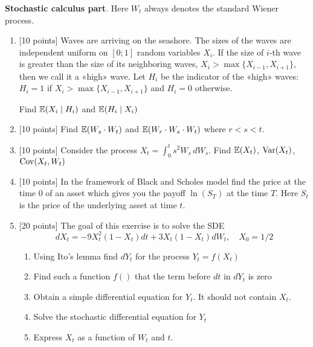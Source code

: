 \documentclass[12pt, a4paper]{article}
\begin{document}
\vspace{20pt}

\textbf{Stochastic calculus part}. Here $W_t$ always denotes the standard Wiener process.

\vspace{20pt}

\begin{enumerate}[resume]
\item $[$10 points] Waves are arriving on the seashore. The sizes of the waves are independent uniform on $[0;1]$ random variables $X_i$. If the size of $i$-th wave is greater than the size of its neighboring waves, $X_i>\max\{X_{i-1},X_{i+1}\}$, then we call it a «high» wave. Let $H_i$ be the indicator of the «high» waves: $H_i=1$ if $X_i>\max\{X_{i-1},X_{i+1}\}$ and $H_i=0$ otherwise.

Find $\mathbb{E}(X_i \mid H_i)$ and $\mathbb{E}(H_i \mid X_i)$
\item $[$10 points] Find $\mathbb{E}(W_s \cdot W_t)$ and $\mathbb{E}(W_r \cdot W_s \cdot W_t)$ where $r<s<t$.
\item $[$10 points] Consider the process $X_t=\int_0^t s^2 W_s\,dW_s$. Find $\mathbb{E}(X_t)$, $\operatorname{Var}(X_t)$, $\operatorname{Cov}(X_t,W_t)$
\item $[$10 points] In the framework of Black and Scholes model find the price at the time $0$ of an asset which gives you the payoff $\ln(S_T)$ at the time $T$. Here $S_t$ is the price of the underlying asset at time $t$.

\item $[$20 points] The goal of this exercise is to solve the SDE
\[
dX_t=-9X_t^2(1-X_t)dt+3X_t(1-X_t)dW_t,\quad X_0=1/2
\]
\begin{enumerate}
\item Using Ito's lemma find $dY_t$ for the process $Y_t=f(X_t)$
\item Find such a function $f()$ that the term before $dt$ in $dY_t$ is zero
\item Obtain a simple differential equation for $Y_t$. It should not contain $X_t$.
\item Solve the stochastic differential equation for $Y_t$
\item Express $X_t$ as a function of $W_t$ and $t$.
\end{enumerate}

\end{enumerate}
\end{document}
